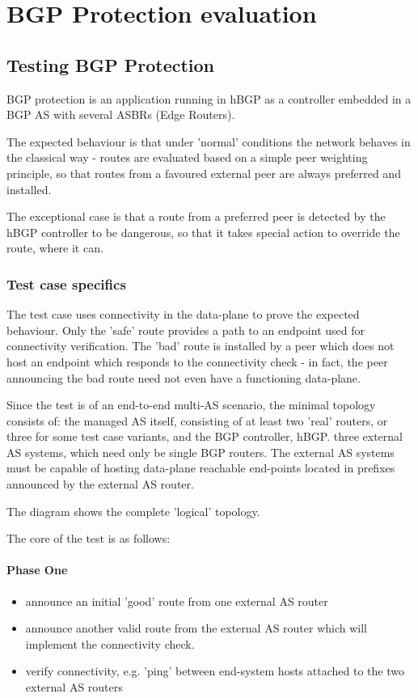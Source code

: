 \section{BGP Protection evaluation}

\subsection{Testing BGP Protection}
BGP protection is an application running in hBGP as a controller embedded in a BGP AS with several ASBRs (Edge Routers).

The expected behaviour is that under 'normal' conditions the network behaves in the classical way - routes are evaluated based on a simple peer weighting principle, so that routes from a favoured external peer are always preferred and installed.

The exceptional case is that a route from a preferred peer is detected by the hBGP controller to be dangerous, so that it takes special action to override the route, where it can.

\subsubsection{Test case specifics}

The test case uses connectivity in the data-plane to prove the expected behaviour. Only the 'safe' route provides a path to an endpoint used for connectivity verification. The 'bad' route is installed by a peer which does not host an endpoint which responds to the connectivity check - in fact, the peer announcing the bad route need not even have a functioning data-plane.

Since the test is of an end-to-end multi-AS scenario, the minimal topology consists of:
the managed AS itself, consisting of at least two 'real' routers, or three for some test case variants,
and the BGP controller, hBGP.
three external AS systems, which need only be single BGP routers. The external AS systems must be capable of hosting data-plane reachable end-points located in prefixes announced by the external AS router.

The diagram shows the complete 'logical' topology.

The core of the test is as follows:

\paragraph{Phase One}
\begin{itemize}
    \item announce an initial 'good' route from one external AS router
    \item announce another valid route from the external AS router which will implement the connectivity check.
    \item verify connectivity, e.g. 'ping' between end-system hosts attached to the two external AS routers
\end{itemize}

